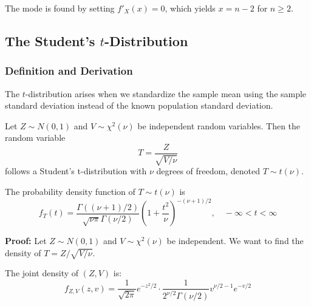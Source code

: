 \documentclass[twoside]{book}
\begin{document}
The mode is found by setting $f'_X(x) = 0$, which yields $x = n-2$ for $n \geq 2$.


\begin{center}
\end{center}

\subsection{The Student's $t$-Distribution}

\subsubsection{Definition and Derivation}

The $t$-distribution arises when we standardize the sample mean using the sample standard deviation instead of the known population standard deviation.

\begin{textbox}
Let $Z \sim N(0,1)$ and $V \sim \chi^2(\nu)$ be independent random variables. Then the random variable
$$T = \frac{Z}{\sqrt{V/\nu}}$$
follows a Student's t-distribution with $\nu$ degrees of freedom, denoted $T \sim t(\nu)$.
\end{textbox}

\begin{textbox}
The probability density function of $T \sim t(\nu)$ is
$$f_T(t) = \frac{\Gamma((\nu+1)/2)}{\sqrt{\nu\pi}\Gamma(\nu/2)} \left(1 + \frac{t^2}{\nu}\right)^{-(\nu+1)/2}, \quad -\infty < t < \infty$$
\end{textbox}

\textbf{Proof:} Let $Z \sim N(0,1)$ and $V \sim \chi^2(\nu)$ be independent. We want to find the density of $T = Z/\sqrt{V/\nu}$.

The joint density of $(Z,V)$ is:
$$f_{Z,V}(z,v) = \frac{1}{\sqrt{2\pi}} e^{-z^2/2} \cdot \frac{1}{2^{\nu/2}\Gamma(\nu/2)} v^{\nu/2-1} e^{-v/2}$$
\end{document}
